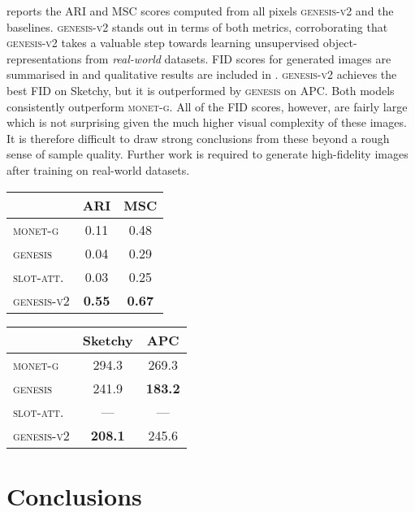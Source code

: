 \documentclass{article}
\begin{document}
 reports the ARI and MSC scores computed from all pixels \textsc{genesis-v2} and the baselines.
\textsc{genesis-v2} stands out in terms of both metrics, corroborating that \textsc{genesis-v2} takes a valuable step towards learning unsupervised object-representations from \emph{real-world} datasets.
FID scores for generated images are summarised in  and qualitative results are included in .
\textsc{genesis-v2} achieves the best FID on Sketchy, but it is outperformed by \textsc{genesis} on APC.
Both models consistently outperform \textsc{monet-g}.
All of the FID scores, however, are fairly large which is not surprising given the much higher visual complexity of these images.
It is therefore difficult to draw strong conclusions from these beyond a rough sense of sample quality.
Further work is required to generate high-fidelity images after training on real-world datasets.

\begin{table*}
	\parbox{0.49\linewidth}{
	    \centering
    	\caption{Segmentation metrics on APC.}
    	\begin{tabular}{lcc}
    		\toprule
    		& ARI  & MSC \\
    		\midrule
    		\textsc{monet-g}     & 0.11 & 0.48 \\
    		\textsc{genesis}   & 0.04 & 0.29 \\
    		\textsc{slot-att.} & 0.03 & 0.25 \\
    		\textsc{genesis-v2} & \textbf{0.55} & \textbf{0.67} \\
    		\bottomrule
    	\end{tabular}
    	\label{tab:gpp:apc}
	}
	\parbox{0.49\linewidth}{
    	\centering
    	\caption{FID scores on Sketchy and APC.}
    	\begin{tabular}{lcc}
    		\toprule
    		& Sketchy & APC \\
    		\midrule
    		\textsc{monet-g}   & 294.3 & 269.3 \\
    		\textsc{genesis}   & 241.9 & \textbf{183.2} \\
    		\textsc{slot-att.} & --- & --- \\
    		\textsc{genesis-v2} & \textbf{208.1} & 245.6 \\
    		\bottomrule
    	\end{tabular}
    	\label{tab:gpp:fid}
	}
\end{table*}

\section{Conclusions}
\end{document}
